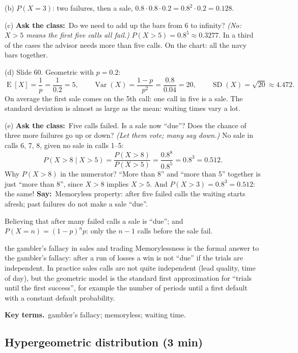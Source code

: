 \documentclass[11pt,a4paper,parskip=half]{scrartcl}
\newcommand{\E}{\operatorname{E}}
\newcommand{\Var}{\operatorname{Var}}
\newcommand{\SD}{\operatorname{SD}}
\newcommand{\terms}{\par\textbf{\color{plum}Key terms.}\ }
\newcommand{\say}{\textbf{\color{teal}Say:}\ }
\newcommand{\ask}{\textbf{\color{navy}Ask the class:}\ }
\begin{document}
(b) $P(X=3)$: two failures, then a sale,
$0.8\cdot0.8\cdot0.2=0.8^2\cdot0.2=0.128$.

(c) \ask Do we need to add up the bars from 6 to infinity? \emph{(No:
$X>5$ means the first five calls all fail.)} $P(X>5)=0.8^5\approx0.3277$.
In a third of the cases the advisor needs more than five calls. On the
chart: all the navy bars together.

(d) Slide 60. Geometric with $p=0.2$:
\[ \E[X]=\frac1p=\frac1{0.2}=5,\qquad
	\Var(X)=\frac{1-p}{p^2}=\frac{0.8}{0.04}=20,\qquad
	\SD(X)=\sqrt{20}\approx4.472. \]
On average the first sale comes on the 5th call: one call in five is a
sale. The standard deviation is almost as large as the mean: waiting
times vary a lot.

(e) \ask Five calls failed. Is a sale now ``due''? Does the chance of
three more failures go up or down? \emph{(Let them vote; many say down.)}
No sale in calls 6, 7, 8, given no sale in calls 1--5:
\[ P(X>8\mid X>5)=\frac{P(X>8)}{P(X>5)}=\frac{0.8^8}{0.8^5}=0.8^3=0.512. \]
Why $P(X>8)$ in the numerator? ``More than 8'' and ``more than 5''
together is just ``more than 8'', since $X>8$ implies $X>5$. And
$P(X>3)=0.8^3=0.512$: the same! \say Memoryless property: after five
failed calls the waiting starts afresh; past failures do not make a sale
``due''.

\begin{mistake}
	Believing that after many failed calls a sale is ``due''; and
	$P(X=n)=(1-p)^np$: only the $n-1$ calls before the sale fail.
\end{mistake}

\begin{bg}{the gambler's fallacy in sales and trading}
	Memorylessness is the formal answer to the gambler's fallacy: after a run
	of losses a win is not ``due'' if the trials are independent. In
	practice sales calls are not quite independent (lead quality, time of
	day), but the geometric model is the standard first approximation for
	``trials until the first success'', for example the number of periods
	until a first default with a constant default probability.

	\terms gambler's fallacy; memoryless; waiting time.
\end{bg}

\needspace{0.4\textheight}
\subsection{Hypergeometric distribution (3 min)}
\end{document}
